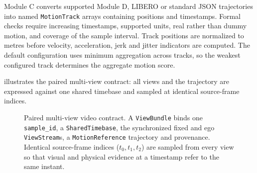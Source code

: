 \documentclass[11pt,oneside]{report}
\begin{document}
Module C converts supported Module D, LIBERO or standard JSON trajectories into
named \texttt{MotionTrack} arrays containing positions and timestamps. Formal
checks require increasing timestamps, supported units, real rather than dummy
motion, and coverage of the sample interval. Track positions are normalized to
metres before velocity, acceleration, jerk and jitter indicators are computed.
The default configuration uses minimum aggregation across tracks, so the
weakest configured track determines the aggregate motion score.

 illustrates the paired multi-view contract: all views and
the trajectory are expressed against one shared timebase and sampled at identical
source-frame indices.

\begin{figure}[htbp]
\centering
{}
\caption[Paired multi-view video contract]{Paired multi-view video contract. A \texttt{ViewBundle} binds one
\texttt{sample\_id}, a \texttt{SharedTimebase}, the synchronized fixed and ego
\texttt{ViewStream}s, a \texttt{MotionReference} trajectory and provenance.
Identical source-frame indices ($t_0,t_1,t_2$) are sampled from every view so
that visual and physical evidence at a timestamp refer to the same instant.}
\label{fig:viewbundle}
\end{figure}
\end{document}
